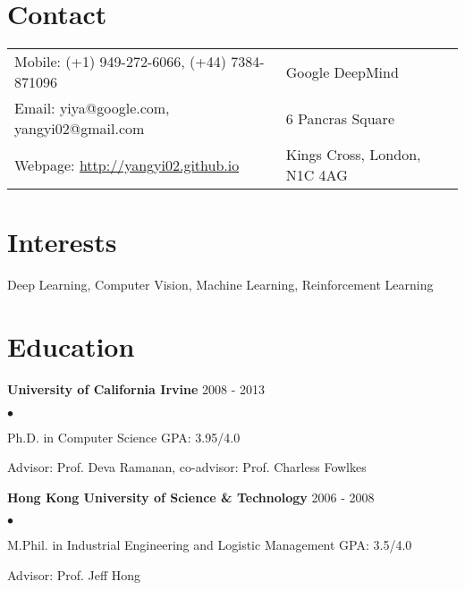 \documentclass[margin]{res3}
\newenvironment{list2}{
  \begin{list}{$\bullet$}{%
      \setlength{\itemsep}{0.02in}
      \setlength{\parsep}{0in} \setlength{\parskip}{0in}
      \setlength{\topsep}{0in} \setlength{\partopsep}{0in}
      \setlength{\leftmargin}{0.2in}}}{\end{list}}
\begin{document}
\begin{resume}

\section{\sc Contact}
\begin{tabular}{@{}p{4.15in}p{2.15in}}
  Mobile: (+1) 949-272-6066, (+44) 7384-871096 & Google DeepMind\\
  Email: yiya@google.com, yangyi02@gmail.com & 6 Pancras Square\\
  Webpage: \url{http://yangyi02.github.io} & Kings Cross, London, N1C 4AG\\
\end{tabular}


\section{\sc Interests}
Deep Learning, Computer Vision, Machine Learning, Reinforcement Learning


\section{\sc Education}
{\bf University of California Irvine} \hfill{2008 - 2013}
\begin{list2}
\item Ph.D. in Computer Science \hfill{GPA: 3.95/4.0}
\vspace{-2pt}
\item Advisor: Prof. Deva Ramanan, co-advisor: Prof. Charless Fowlkes
\end{list2}
\vspace{-2pt}\vspace{-2pt}\vspace{-2pt}

{\bf Hong Kong University of Science \& Technology} \hfill {2006 - 2008}
\begin{list2}
\item M.Phil. in Industrial Engineering and Logistic Management \hfill {GPA: 3.5/4.0}
\vspace{-2pt}
\item Advisor: Prof. Jeff Hong
\end{list2}
\vspace{-2pt}\vspace{-2pt}\vspace{-2pt}


\end{resume}
\end{document}
